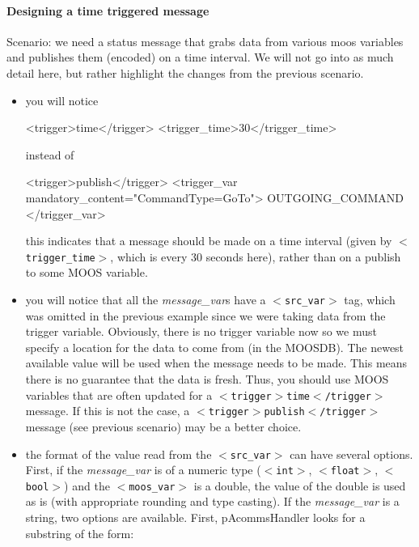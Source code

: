 \documentclass[11pt, letterpaper, oneside]{memoir}
\newcommand{\xmltag}[1]{\texttt{$<$#1$>$}}
\begin{document}
\paragraph{Designing a time triggered message}
Scenario: we need a status message that grabs data from various moos variables and publishes them (encoded) on a time interval. We will not go into as much detail here, but rather highlight the changes from the previous scenario.
\begin{itemize}
\item you will notice
\begin{small}
\begin{boxedverbatim}
    <trigger>time</trigger>
    <trigger_time>30</trigger_time>
\end{boxedverbatim}
\resetbvlinenumber
\end{small}
instead of 
\begin{small}
\begin{boxedverbatim}
    <trigger>publish</trigger>
    <trigger_var mandatory_content="CommandType=GoTo"> 
      OUTGOING_COMMAND
    </trigger_var>
\end{boxedverbatim}
\resetbvlinenumber
\end{small}
this indicates that a message should be made on a time interval (given by \xmltag{trigger\_time}, which is every 30 seconds here), rather than on a publish to some MOOS variable.
\item you will notice that all the \textit{message\_var}s have a \xmltag{src\_var} tag, which was omitted in the previous example since we were taking data from the trigger variable. Obviously, there is no trigger variable now so we must specify a location for the data to come from (in the MOOSDB). The newest available value will be used when the message needs to be made. This means there is no guarantee that the data is fresh. Thus, you should use MOOS variables that are often updated for a \xmltag{trigger$>$time$<$/trigger} message. If this is not the case, a \xmltag{trigger$>$publish$<$/trigger} message (see previous scenario) may be a better choice.
\item the format of the value read from the \xmltag{src\_var} can have several options. First, if the \textit{message\_var} is of a numeric type (\xmltag{int}, \xmltag{float}, \xmltag{bool}) and the \xmltag{moos\_var} is a double, the value of the double is used as is (with appropriate rounding and type casting). If the \textit{message\_var} is a string, two options are available. First, pAcommsHandler looks for a substring of the form:

\end{itemize}
\end{document}
